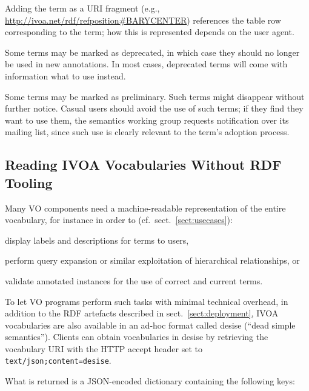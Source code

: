 \documentclass[11pt,a4paper]{ivoa}
\begin{document}
Adding the term as a URI fragment (e.g.,
\url{http://ivoa.net/rdf/refposition#BARYCENTER}) references the
table row corresponding to the term; how this is represented depends on
the user agent.

Some terms may be marked as deprecated, in which case they should no
longer be used in new annotations.  In most cases, deprecated terms will
come with information what to use instead.

Some terms may be marked as preliminary.  Such terms might disappear
without further notice.  Casual users should avoid the use of such
terms; if they find they want to use them, the semantics working group
requests notification over its mailing list, since such use is clearly
relevant to the term's adoption process.


\subsection{Reading IVOA Vocabularies Without RDF Tooling}
\label{sect:desise}

Many VO components need a machine-readable representation of the
entire vocabulary, for instance in order to
(cf.~sect.~\ref{sect:usecases}):

\begin{compactitem}
\item display labels and descriptions for terms to users,
\item perform query expansion or similar exploitation of hierarchical
relationships, or
\item validate annotated instances for the use of correct and current
terms.
\end{compactitem}

To let VO programs perform such tasks with minimal technical overhead,
in addition to the RDF artefacts described in
sect.~\ref{sect:deployment}, IVOA vocabularies are also available in an
ad-hoc format called desise (``dead simple semantics'').  Clients can
obtain vocabularies in desise by retrieving the vocabulary URI with the
HTTP accept header set to \texttt{text/json;content=desise}.

What is returned is a JSON-encoded \citep{std:JSON} dictionary
containing the following keys:
\end{document}
